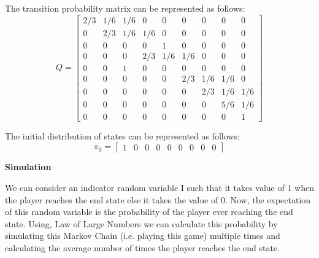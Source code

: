 \documentclass{article}
\begin{document}
\begin{enumerate}
        The transition probability matrix can be represented as follows:
        \begin{equation}
        \nonumber
            Q = \begin{bmatrix}
                2/3 & 1/6 & 1/6 & 0 & 0 & 0 & 0 & 0 & 0 \\
                0 & 2/3 & 1/6 & 1/6 & 0 & 0 & 0 & 0 & 0 \\
                0 & 0 & 0 & 0 & 1 & 0 & 0 & 0 & 0 \\
                0 & 0 & 0 & 2/3 & 1/6 & 1/6 & 0 & 0 & 0 \\
                0 & 0 & 1 & 0 & 0 & 0 & 0 & 0 & 0 \\ 
                0 & 0 & 0 & 0 & 0 & 2/3 & 1/6 & 1/6 & 0 \\
                0 & 0 & 0 & 0 & 0 & 0 & 2/3 & 1/6 & 1/6 \\
                0 & 0 & 0 & 0 & 0 & 0 & 0 & 5/6 & 1/6 \\
                0 & 0 & 0 & 0 & 0 & 0 & 0 & 0 & 1
                \end{bmatrix}
        \end{equation}

        The initial distribution of states can be represented as follows:
        \begin{equation}
        \nonumber
            \pi_{0} = \begin{bmatrix}
                       1 & 0 & 0 & 0 & 0 & 0 & 0 & 0 & 0
                      \end{bmatrix}
        \end{equation}

        \textbf{Simulation} \par
	
	    \noindent %
        We can consider an indicator random variable I such that it takes value of $1$ when the player reaches the end state else it
        takes the value of $0$. Now, the expectation of this random variable is the probability of the player ever reaching the end state.
        Using, Law of Large Numbers we can calculate this probability by simulating this Markov Chain (i.e. playing this game) multiple
        times and calculating the average number of times the player reaches the end state.\par
	

\end{enumerate}
\end{document}
